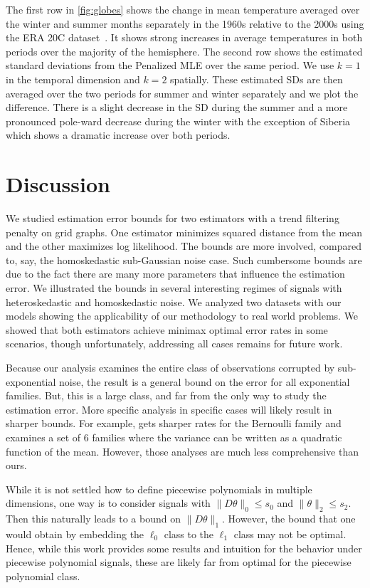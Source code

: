 \documentclass[ejs,noshowframe]{imsart}
\theoremstyle{plain}
\theoremstyle{definition}
\begin{document}
The first row in \autoref{fig:globes} shows the change in mean temperature averaged
over the winter and summer months separately in the 1960s relative to the 2000s
using the ERA 20C dataset~\citep{PoliHersbach2016}. It shows strong increases in
average temperatures in both periods over the majority of the hemisphere.
The second row shows the estimated standard deviations from
the Penalized MLE over the same period. We use $k=1$ in the temporal dimension and
$k=2$ spatially. These estimated SDs are then averaged over the two periods for
summer and winter separately and we plot the difference. There is a slight
decrease in the SD during the summer and a more pronounced pole-ward decrease
during the winter with the exception of Siberia which shows a dramatic increase
over both periods. 


\section{Discussion}
We studied estimation error bounds for two estimators with a trend filtering
penalty on grid graphs. One estimator minimizes squared distance from the mean
and the other maximizes log likelihood. The bounds are more involved, compared
to, say, the homoskedastic sub-Gaussian noise case. Such cumbersome bounds are
due 
to the fact there are many more parameters that influence the estimation error.
We illustrated the bounds in several interesting regimes of signals with
heteroskedastic and homoskedastic noise. We analyzed two datasets with our
models showing the applicability of our methodology to real world problems. We
showed that both estimators achieve minimax optimal error rates in some
scenarios, though unfortunately, addressing all cases remains for future work.

Because our analysis examines the entire class of observations corrupted by
sub-exponential noise, the result is a general bound on the error for all exponential families. But,
this is a large class, and far from the only way to study the estimation error.
More specific analysis in specific cases will likely result in sharper bounds.
For example, \cite{vandeGeer2020logistic} gets sharper rates for the Bernoulli
family and \cite{brown2010nonparametric} examines a set of 6 families where the
variance can be written as a quadratic function of the mean. However, those
analyses are much less comprehensive than ours.

While it is not settled how to define piecewise polynomials in multiple
dimensions, one way is to consider signals with $\| D \theta \|_0 \le s_0$ and
$\| \theta \|_2 \le s_2$.  Then this naturally leads to a bound on $\| D \theta
\|_1$. However, the bound that one would obtain by embedding the $\ell_0$ class
to the $\ell_1$ class may not be optimal. Hence, while this work provides some
results and intuition for the behavior under piecewise polynomial signals, these
are likely far from optimal for the piecewise polynomial class.
\end{document}
